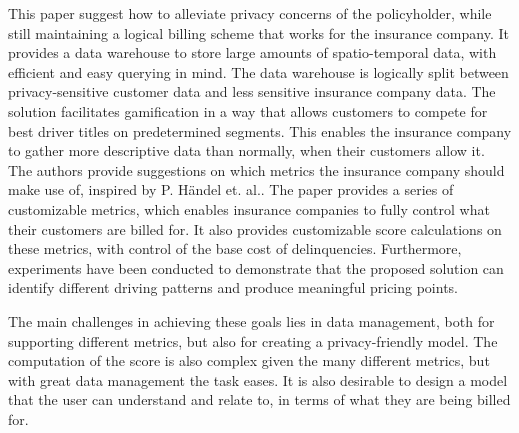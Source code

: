 This paper suggest how to alleviate privacy concerns of the policyholder, while still maintaining a logical billing scheme that works for the insurance company. It provides a data warehouse to store large amounts of spatio-temporal data, with efficient and easy querying in mind. The data warehouse is logically split between privacy-sensitive customer data and less sensitive insurance company data. The solution facilitates gamification in a way that allows customers to compete for best driver titles on predetermined segments. This enables the insurance company to gather more descriptive data than normally, when their customers allow it. The authors provide suggestions on which metrics the insurance company should make use of, inspired by P. Händel et. al.\cite{art:insurtelematics}\cite{art:smartphonemonitor}. The paper provides a series of customizable metrics, which enables insurance companies to fully control what their customers are billed for. It also provides customizable score calculations on these metrics, with control of the base cost of delinquencies. Furthermore, experiments have been conducted to demonstrate that the proposed solution can identify different driving patterns and produce meaningful pricing points.

The main challenges in achieving these goals lies in data management, both for supporting different metrics, but also for creating a privacy-friendly model. The computation of the score is also complex given the many different metrics, but with great data management the task eases. It is also desirable to design a model that the user can understand and relate to, in terms of what they are being billed for.